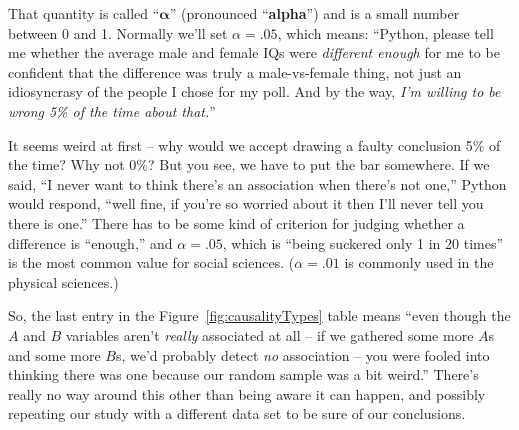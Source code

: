 
That quantity is called ``$\boldsymbol{\alpha}$'' (pronounced
``\textbf{alpha}'') and is a small number between 0 and 1. Normally we'll set
$\alpha=.05$, which means: ``Python, please tell me whether the average male
and female IQs were \textit{different enough} for me to be confident that the
difference was truly a male-vs-female thing, not just an idiosyncrasy of the
people I chose for my poll. And by the way, \textit{I'm willing to be wrong 5\%
of the time about that.}''

It seems weird at first -- why would we accept drawing a faulty conclusion 5\%
of the time? Why not 0\%? But you see, we have to put the bar somewhere. If we
said, ``I never want to think there's an association when there's not one,''
Python would respond, ``well fine, if you're so worried about it then I'll
never tell you there is one.'' There has to be some kind of criterion for
judging whether a difference is ``enough,'' and $\alpha=.05$, which is ``being
suckered only 1 in 20 times'' is the most common value for social sciences.
($\alpha=.01$ is commonly used in the physical sciences.)

So, the last entry in the Figure~\ref{fig:causalityTypes} table means ``even
though the $A$ and $B$ variables aren't \textit{really} associated at all -- if
we gathered some more $A$s and some more $B$s, we'd probably detect \textit{no}
association -- you were fooled into thinking there was one because our random
sample was a bit weird.'' There's really no way around this other than being
aware it can happen, and possibly repeating our study with a different data
set to be sure of our conclusions.
